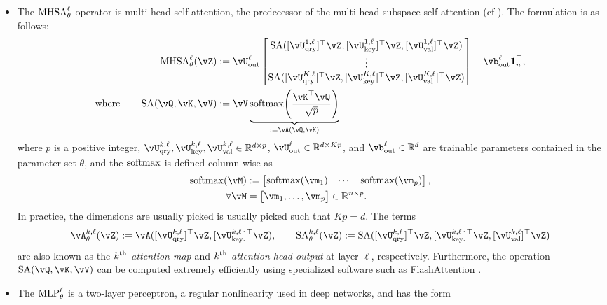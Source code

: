 \documentclass[\toplevelprefix/book-main.tex]{subfiles}
\begin{document}
\begin{itemize}
    \item The \(\operatorname{MHSA}_{\theta}^{\ell}\) operator is multi-head-self-attention, the predecessor of the multi-head subspace self-attention (cf ). The formulation is as follows:
    \begin{align}
        \MHSA_{\theta}^{\ell}(\vZ) \label{eq:mhsa}
        &:= \vU_{\out}^{\ell}\mat{\SA([\vU_{\query}^{1, \ell}]^{\top}\vZ, [\vU_{\key}^{1, \ell}]^{\top}\vZ, [\vU_{\val}^{1, \ell}]^{\top}\vZ) \\ \vdots \\ \SA([\vU_{\query}^{K, \ell}]^{\top}\vZ, [\vU_{\key}^{K, \ell}]^{\top}\vZ, [\vU_{\val}^{K, \ell}]^{\top}\vZ)} + \vb_{\out}^{\ell}\vone_{n}^{\top}, \\
        \label{eq:self_attention}
        \text{where} \qquad \SA(\vQ, \vK, \vV)
        &:= \vV \underbrace{\softmax\rp{\frac{\vK^{\top}\vQ}{\sqrt{p}}}}_{:= \vA(\vQ, \vK)}
    \end{align}
    where \(p\) is a positive integer, \(\vU_{\query}^{k, \ell}, \vU_{\key}^{k, \ell}, \vU_{\val}^{k, \ell} \in \R^{d \times p}\), \(\vU_{\out}^{\ell} \in \R^{d \times Kp}\), and \(\vb_{\out}^{\ell} \in \R^{d}\) are trainable parameters contained in the parameter set \(\theta\), and the \(\operatorname{\mathrm{softmax}}\) is defined column-wise as 
    \begin{align}
        \softmax(\vM) 
        &:= \mat{\softmax(\vm_{1}) & \cdots & \softmax(\vm_{p})}, \\ 
        \forall \vM 
        &= \mat{\vm_{1}, \dots, \vm_{p}} \in \R^{n \times p}.
    \end{align}
    In practice, the dimensions are usually picked is usually picked such that \(Kp = d\). The terms 
    \begin{equation}
        \label{eq:attention_map}
        \vA_{\theta}^{k, \ell}(\vZ) := \vA([\vU_{\query}^{k, \ell}]^{\top}\vZ, [\vU_{\key}^{k, \ell}]^{\top}\vZ), \qquad \SA_{\theta}^{k, \ell}(\vZ) := \SA([\vU_{\query}^{k, \ell}]^{\top}\vZ, [\vU_{\key}^{k, \ell}]^{\top}\vZ, [\vU_{\val}^{k, \ell}]^{\top}\vZ)
    \end{equation}
    are also known as the \textit{\(k^{\textnormal{th}}\) attention map} and \textit{\(k^{\textnormal{th}}\) attention head output} at layer \(\ell\), respectively. Furthermore, the operation \(\SA(\vQ, \vK, \vV)\) can be computed extremely efficiently using specialized software such as FlashAttention \citep{shah2025flashattention}.
    \item The \(\operatorname{MLP}_{\theta}^{\ell}\) is a two-layer perceptron, a regular nonlinearity used in deep networks, and has the form 

\end{itemize}
\end{document}
